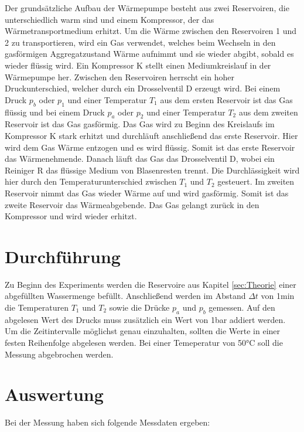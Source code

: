     Der grundsätzliche Aufbau der Wärmepumpe besteht aus zwei Reservoiren, die unterschiedlich warm sind und einem Kompressor,
    der das Wärmetransportmedium erhitzt.
    Um die Wärme zwischen den Reservoiren 1 und 2 zu transportieren, wird ein Gas verwendet, welches beim Wechseln in den gasförmigen
    Aggregatzustand Wärme aufnimmt und sie wieder abgibt, sobald es wieder flüssig wird.
    Ein Kompressor K stellt einen Mediumkreislauf in der Wärmepumpe her.
    Zwischen den Reservoiren herrscht ein hoher Druckunterschied, welcher durch ein Drosselventil D erzeugt wird.
    Bei einem Druck $p_b$ oder $p_1$ und einer Temperatur $T_1$ aus dem ersten Reservoir ist das Gas flüssig und bei einem Druck $p_a$ oder $p_2$
    und einer Temperatur $T_2$ aus dem zweiten Reservoir ist das Gas gasförmig.
    Das Gas wird zu Beginn des Kreislaufs im Kompressor K stark erhitzt und durchläuft anschließend das erste Reservoir.
    Hier wird dem Gas Wärme entzogen und es wird flüssig. Somit ist das erste Reservoir das Wärmenehmende.
    Danach läuft das Gas das Drosselventil D, wobei ein Reiniger R das flüssige Medium von Blasenresten trennt.
    Die Durchlässigkeit wird hier durch den Temperaturunterschied zwischen $T_1$ und $T_2$ gesteuert.
    Im zweiten Reservoir nimmt das Gas wieder Wärme auf und wird gasförmig. Somit ist das zweite Reservoir das Wärmeabgebende.
    Das Gas gelangt zurück in den Kompressor und wird wieder erhitzt.


\section{Durchführung} \label{sec:Durchführung}
    Zu Beginn des Experiments werden die Reservoire aus Kapitel \ref{sec:Theorie} einer abgefüllten Wassermenge befüllt.
    Anschließend werden im Abstand $\Delta t$ von 1min die Temperaturen $T_1$ und $T_2$ sowie die Drücke $p_a$ und $p_b$ gemessen.
    Auf den abgelesen Wert des Drucks muss zusätzlich ein Wert von 1bar addiert werden.
    Um die Zeitintervalle möglichst genau einzuhalten, sollten die Werte in einer festen Reihenfolge abgelesen werden.
    Bei einer Temeperatur von 50°C soll die Messung abgebrochen werden.

\section{Auswertung} \label{sec:Auswertung}
    Bei der Messung haben sich folgende Messdaten ergeben:



